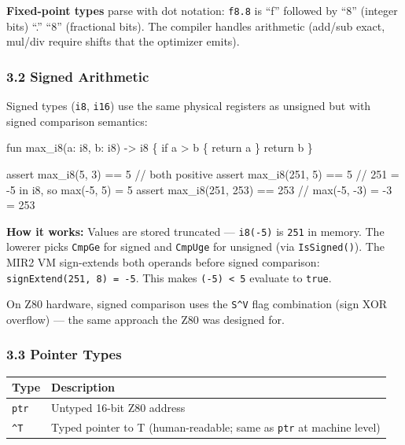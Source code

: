 \documentclass[
  11pt,
]{article}
\newenvironment{Shaded}{}{}
\newcommand{\NormalTok}[1]{#1}
\begin{document}
\textbf{Fixed-point types} parse with dot notation: \texttt{f8.8} is
``f'' followed by ``8'' (integer bits) ``.'' ``8'' (fractional bits).
The compiler handles arithmetic (add/sub exact, mul/div require shifts
that the optimizer emits).

\subsubsection{3.2 Signed Arithmetic}\label{signed-arithmetic}

Signed types (\texttt{i8}, \texttt{i16}) use the same physical registers
as unsigned but with signed comparison semantics:

\begin{Shaded}
\begin{Highlighting}[]
\NormalTok{fun max\_i8(a: i8, b: i8) {-}\textgreater{} i8 \{}
\NormalTok{    if a \textgreater{} b \{ return a \}}
\NormalTok{    return b}
\NormalTok{\}}

\NormalTok{assert max\_i8(5, 3) == 5         // both positive}
\NormalTok{assert max\_i8(251, 5) == 5       // 251 = {-}5 in i8, so max({-}5, 5) = 5}
\NormalTok{assert max\_i8(251, 253) == 253   // max({-}5, {-}3) = {-}3 = 253}
\end{Highlighting}
\end{Shaded}

\textbf{How it works:} Values are stored truncated --- \texttt{i8(-5)}
is \texttt{251} in memory. The lowerer picks \texttt{CmpGe} for signed
and \texttt{CmpUge} for unsigned (via \texttt{IsSigned()}). The MIR2 VM
sign-extends both operands before signed comparison:
\texttt{signExtend(251,\ 8)\ =\ -5}. This makes
\texttt{(-5)\ \textless{}\ 5} evaluate to \texttt{true}.

On Z80 hardware, signed comparison uses the \texttt{S\^{}V} flag
combination (sign XOR overflow) --- the same approach the Z80 was
designed for.

\subsubsection{3.3 Pointer Types}\label{pointer-types}

\begin{longtable}[]{@{}
  >{\raggedright\arraybackslash}p{}
  >{\raggedright\arraybackslash}p{}@{}}
\toprule\noalign{}
\begin{minipage}[b]{\linewidth}\raggedright
Type
\end{minipage} & \begin{minipage}[b]{\linewidth}\raggedright
Description
\end{minipage} \\
\midrule\noalign{}
\endhead
\bottomrule\noalign{}
\endlastfoot
\texttt{ptr} & Untyped 16-bit Z80 address \\
\texttt{\^{}T} & Typed pointer to T (human-readable; same as
\texttt{ptr} at machine level) \\
\end{longtable}
\end{document}
